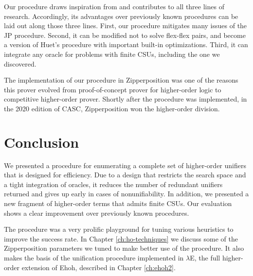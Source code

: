 Our procedure draws inspiration from and contributes to all three lines of research.
Accordingly, its advantages over previously known procedures can be laid out
along those three lines. First, our procedure mitigates many issues of the 
JP procedure. Second, it can be modified not to solve flex-flex pairs,
and become a version of Huet's procedure with important built-in optimizations.
Third, it can integrate any oracle for problems with finite CSUs, including the one we discovered.


The implementation of our procedure in Zipperposition was one of the reasons
this prover evolved from proof-of-concept prover for higher-order logic to
competitive higher-order prover. Shortly after the procedure was implemented, in the 2020 edition of CASC, Zipperposition won
the higher-order division. 

\section{Conclusion}
We presented a procedure for enumerating a complete set of higher-order unifiers
that is designed for efficiency. Due to a design that restricts 
the search space and a tight integration of oracles,
 it reduces the number of redundant unifiers returned and
gives up early in cases of nonunifiability. In addition, we presented a new
fragment of higher-order terms that admits finite CSUs. Our evaluation shows
a clear improvement over previously known procedures.

The procedure was a very prolific playground for tuning various heuristics
to improve the success rate. In Chapter \ref{ch:ho-techniques} we discuss
some of the Zipperposition parameters we tuned to make better use of the procedure.
It also makes the basis of the unification procedure implemented in $\lambda$E,
the full higher-order extension of Ehoh, described in Chapter \ref{ch:ehoh2}.


